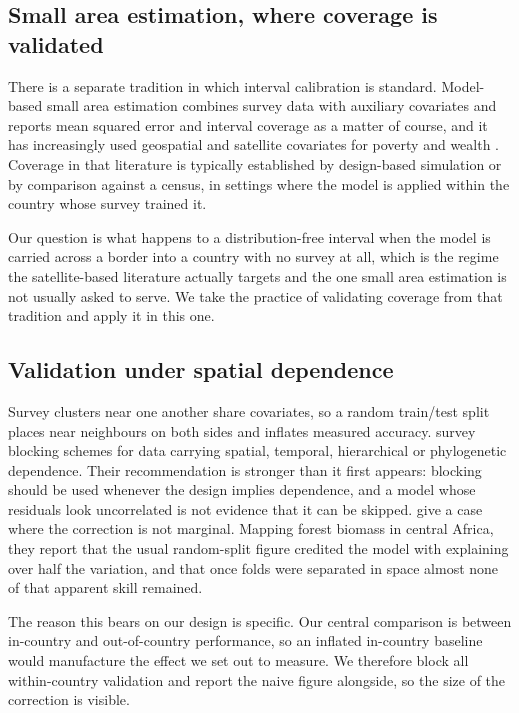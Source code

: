 \documentclass[11pt]{article}
\begin{document}
\subsection{Small area estimation, where coverage is validated}

There is a separate tradition in which interval calibration is standard.
Model-based small area estimation combines survey data with auxiliary
covariates and reports mean squared error and interval coverage as a matter of
course, and it has increasingly used geospatial and satellite covariates for
poverty and wealth \citep{masaki2020,newhouse2023,permatasari2025}. Coverage in
that literature is typically established by design-based simulation or by
comparison against a census, in settings where the model is applied within the
country whose survey trained it.

Our question is what happens to a distribution-free interval when the model is
carried across a border into a country with no survey at all, which is the
regime the satellite-based literature actually targets and the one small area
estimation is not usually asked to serve. We take the practice of validating
coverage from that tradition and apply it in this one.

\subsection{Validation under spatial dependence}

Survey clusters near one another share covariates, so a random train/test split
places near neighbours on both sides and inflates measured accuracy.
\citet{roberts2017} survey blocking schemes for data
carrying spatial, temporal, hierarchical or phylogenetic dependence. Their
recommendation is stronger than it first appears: blocking should be used
whenever the design implies dependence, and a model whose residuals look
uncorrelated is not evidence that it can be skipped. \citet{ploton2020} give a case where the
correction is not marginal. Mapping forest biomass in central Africa, they
report that the usual random-split figure credited the model with explaining
over half the variation, and that once folds were separated in space almost none
of that apparent skill remained.

The reason this bears on our design is specific. Our central comparison is between
in-country and out-of-country performance, so an inflated in-country baseline
would manufacture the effect we set out to measure. We therefore block all
within-country validation and report the naive figure alongside, so the size of
the correction is visible.
\end{document}
